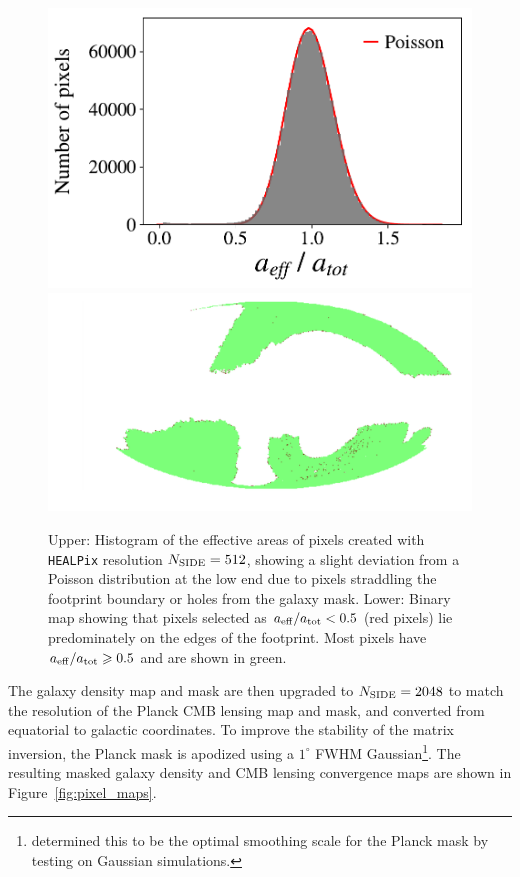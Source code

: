 \documentclass[a4paper,usenatbib]{mnras}
\begin{document}
\begin{figure}
    \centering
    \includegraphics[width=0.85\columnwidth, trim={0.1cm 0 0 0},clip]{figures/poisson.pdf}  
    \includegraphics[width=\columnwidth]{figures/boundary.pdf}
    \caption{Upper: Histogram of the effective areas of pixels created with \texttt{HEALPix} resolution $N_{\rm SIDE} = 512$, showing a slight deviation from a Poisson distribution at the low end due to pixels straddling the footprint boundary or holes from the galaxy mask. Lower: Binary map showing that pixels selected as $a_{\rm eff}/a_{\rm tot} < 0.5$ (red pixels) lie predominately on the edges of the footprint. Most pixels have $a_{\rm eff}/a_{\rm tot} \geq 0.5$ and are shown in green.}
    \label{fig:desi_mask}
\end{figure}

The galaxy density map and mask are then upgraded to $N_{\rm SIDE} = 2048$ to match the resolution of the Planck CMB lensing map and mask, and converted from equatorial to galactic coordinates. To improve the stability of the matrix inversion, the Planck mask is apodized using a $1^{\circ}$ FWHM Gaussian\footnote{\citealt{Krolewski19} determined this to be the optimal smoothing scale for the Planck mask by testing on Gaussian simulations.}. The resulting masked galaxy density and CMB lensing convergence maps are shown in Figure~\ref{fig:pixel_maps}.
\end{document}
